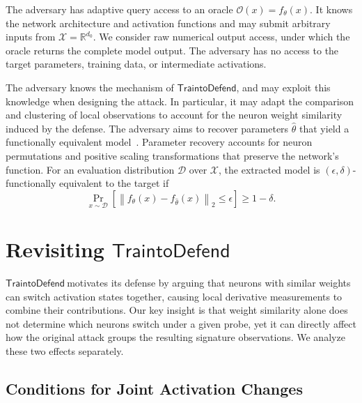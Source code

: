 \documentclass[runningheads]{llncs}
\newcommand{\mypara}[1]{\smallskip\noindent{\bf {#1}.} \xspace}
\newcommand{\td}{$\mathsf{Train to Defend}~$}
\newcommand{\nospacetd}{$\mathsf{Train to Defend}$}
\begin{document}
\mypara{Adversarial Goals and Resources}
The adversary has adaptive query access to an oracle $\mathcal O(x)=f_\theta(x)$.
It knows the network architecture and activation functions and may submit arbitrary inputs from $\mathcal X=\mathbb R^{d_0}$.
We consider raw numerical output access, under which the oracle returns the complete model output.
The adversary has no access to the target parameters, training data, or intermediate activations.

The adversary knows the mechanism of \nospacetd, and may exploit this knowledge when designing the attack.
In particular, it may adapt the comparison and clustering of local observations to account for the neuron weight similarity induced by the defense.
The adversary aims to recover parameters $\widehat\theta$ that yield a functionally equivalent model~\cite{carlini_crypto_cea1,jagielski_usenix_tea3}.
Parameter recovery accounts for neuron permutations and positive scaling transformations that preserve the network's function.
For an evaluation distribution $\mathcal D$ over $\mathcal X$, the extracted model is $(\epsilon,\delta)$-functionally equivalent to the target if
\begin{equation*}
\Pr_{x\sim\mathcal D}\left[\left\|f_\theta(x)-f_{\widehat\theta}(x)\right\|_2\leq\epsilon\right]\geq1-\delta.
\end{equation*}

\section{Revisiting \td}
\label{sec:failure}
\td motivates its defense by arguing that neurons with similar weights can switch activation states together, causing local derivative measurements to combine their contributions.
Our key insight is that weight similarity alone does not determine which neurons switch under a given probe, yet it can directly affect how the original attack groups the resulting signature observations.
We analyze these two effects separately.

\subsection{Conditions for Joint Activation Changes}
\label{sec:activation-changes}
\end{document}
